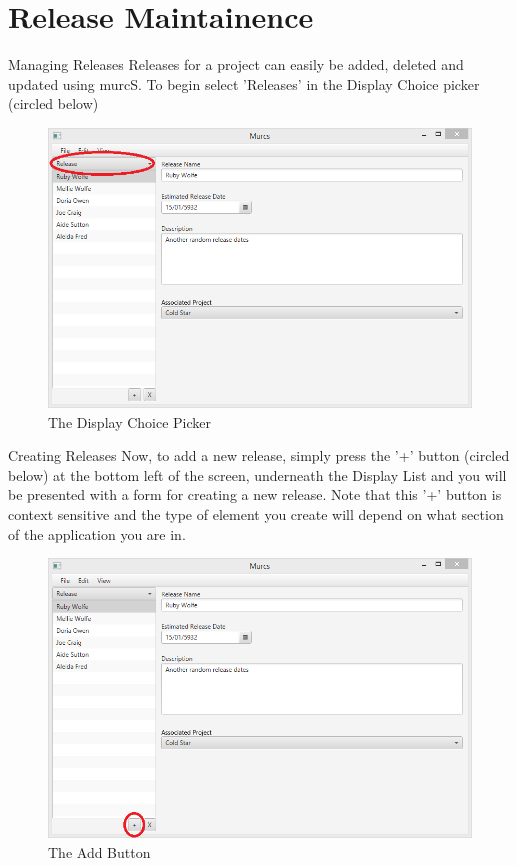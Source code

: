 \section{Release Maintainence}

Managing Releases
\newline
Releases for a project can easily be added, deleted and updated using murcS. To begin select 'Releases' in the Display Choice picker (circled below)

\begin{figure}[H]
\centering
\includegraphics[width=\textwidth]{images/screenshots/releases1.PNG}
\caption{The Display Choice Picker}
\label{fig:new_project}
\end{figure}

Creating Releases
\newline
Now, to add a new release, simply press the '+' button (circled below) at the bottom left of the screen, underneath the Display List and you will be presented with a form for creating a new release. Note that this '+' button is context sensitive and the type of element you create will depend on what section of the application you are in.

\begin{figure}[H]
\centering
\includegraphics[width=\textwidth]{images/screenshots/releases2.PNG}
\caption{The Add Button}
\label{fig:new_project}
\end{figure}

